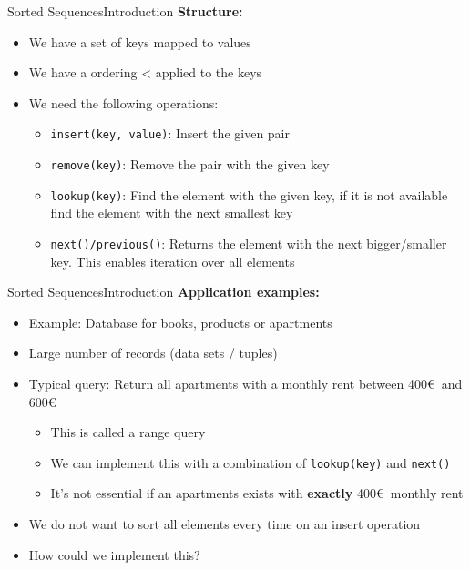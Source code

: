 
\begin{frame}{Sorted Sequences}{Introduction}
  \textbf{Structure:}
  \begin{itemize}
    \item<2->
      We have a set of {\color{MainA}keys} mapped to
      {\color{MainA}values}
    \item<3->
      We have a ordering {\color{MainA}<} applied to the keys
    \item<4->
      We need the following operations:
      \begin{itemize}
      \item<5->{\color{MainA}\texttt{insert(key, value)}}:
        Insert the given pair
      \item<6->{\color{MainA}\texttt{remove(key)}}:
        Remove the pair with the given {\color{MainA}key}
      \item<7->{\color{MainA}\texttt{lookup(key)}}:
        Find the element with the given {\color{MainA}key},
        if it is not available find the element with the next smallest key
      \item<8->{\color{MainA}\texttt{next()/previous()}}:
        Returns the element with the next bigger/smaller {\color{MainA}key}.
        This enables iteration over all elements
      \end{itemize}
  \end{itemize}
\end{frame}


\begin{frame}{Sorted Sequences}{Introduction}
  \textbf{Application examples:}
  \begin{itemize}
    \item<2->
      Example: Database for books, products or apartments
    \item<3->
      Large number of records (data sets / tuples)
    \item<4->
      Typical query: Return all apartments with a monthly rent between
      400\euro\, and 600\euro
      \begin{itemize}
        \item<5->
          This is called a {\color{MainA}range query}
        \item<6->
          We can implement this with a combination of
          {\color{MainA}\texttt{lookup(key)}} and
          {\color{MainA}\texttt{next()}}
        \item<7->
          It's not essential if an apartments exists with \textbf{exactly}
          400\euro\, monthly rent
      \end{itemize}
    \item<8->
      We do not want to sort all elements every time on an 
      {\color{MainA}insert} operation
     \item<9->
      How could we implement this?
  \end{itemize}
\end{frame}

